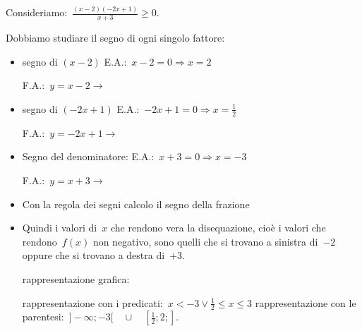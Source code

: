 \begin{exrig}
 \begin{esempio}
Consideriamo:~$\frac{(x-2)(-2x+1)}{x+3} \ge 0$.

Dobbiamo studiare il segno di ogni singolo fattore:
\begin{itemize}
 \item segno di $(x-2)$
 \subitem E.A.:~$x-2=0 \Rightarrow x=2$
 \subitem
  \begin{minipage}{.25\textwidth}
   F.A.:~$y=x-2 \rightarrow $
  \end{minipage}
  \begin{minipage}{.30\textwidth}
  \end{minipage}
 \item segno di $(-2x+1)$
 \subitem E.A.:~$-2x+1=0 \Rightarrow x=\frac{1}{2}$
 \subitem
  \begin{minipage}{.25\textwidth}
   F.A.:~$y=-2x+1 \rightarrow $
  \end{minipage}
  \begin{minipage}{.30\textwidth}
  \end{minipage}
 \item Segno del denominatore:
 \subitem E.A.:~$x + 3=0 \Rightarrow x=-3$
 \subitem
  \begin{minipage}{.25\textwidth}
   F.A.:~$y=x +3 \rightarrow $
  \end{minipage}
  \begin{minipage}{.30\textwidth}
  \end{minipage}
 \item Con la regola dei segni calcolo il segno della frazione 
 \item Quindi i valori di~$x$ che rendono vera la disequazione, cioè i valori
  che rendono~$f(x)$ non negativo, sono quelli 
  che si trovano a sinistra di~$-2$ oppure che si trovano a destra di~$+3$. 
 \subitem 
  \begin{minipage}{.35\textwidth}
   rappresentazione grafica: 
  \end{minipage}
  \begin{minipage}{.30\textwidth}
  \end{minipage}
 \subitem rappresentazione con i 
   predicati:~$x < -3 \lor \frac{1}{2} \le x \le 3$ 
 \subitem rappresentazione con le 
  parentesi:~$]-\infty; -3[ \quad \cup \quad [\frac{1}{2}; 2;]$. 
\end{itemize}
 \end{esempio}
\end{exrig}

